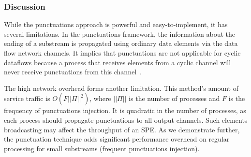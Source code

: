 \subsubsection{Discussion}

While the punctuations approach is powerful and easy-to-implement, it has several limitations. In the punctuations framework, the information about the ending of a substream is propagated using ordinary data elements via the data flow network channels. It implies that punctuations are not applicable for cyclic dataflows because a process that receives elements from a cyclic channel will never receive punctuations from this channel~\cite{carbone2018scalable}.

The high network overhead forms another limitation. This method's amount of service traffic is $O(F||\Pi||^2)$, where $||\Pi||$ is the number of processes and $F$ is the frequency of punctuations injection. It is quadratic in the number of processes, as each process should propagate punctuations to all output channels. Such elements broadcasting may affect the throughput of an SPE. As we demonstrate further, the punctuation technique adds significant performance overhead on regular processing for small substreams (frequent punctuations injection).